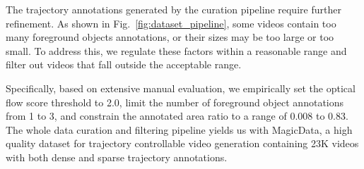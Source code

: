 The trajectory annotations generated by the curation pipeline require further refinement. As shown in Fig.~\ref{fig:dataset_pipeline}, some videos contain too many foreground objects annotations, or their sizes may be too large or too small. To address this, we regulate these factors within a reasonable range and filter out videos that fall outside the acceptable range.

Specifically, based on extensive manual evaluation, we empirically set the optical flow score threshold to 2.0, limit the number of foreground object annotations from 1 to 3, and constrain the annotated area ratio to a range of 0.008 to 0.83. The whole data curation and filtering pipeline yields us with MagicData, a high quality dataset for trajectory controllable video generation containing 23K videos with both dense and sparse trajectory annotations.

